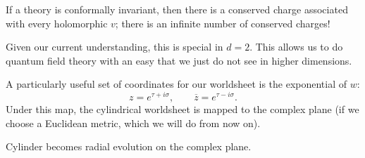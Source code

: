 If a theory is conformally invariant, then there is a conserved charge associated with every holomorphic $v$; there is an infinite number of conserved charges!
\begin{remark}
  Given our current understanding, this is special in $d = 2$.
  This allows us to do quantum field theory with an easy that we just do not see in higher dimensions.
\end{remark}

A particularly useful set of coordinates for our worldsheet is the exponential of $w$:
\begin{equation}
  \label{eq:z}
  z = e^{\tau + i \sigma}, \qquad \overline{z}{} = e^{\tau - i \sigma}.
\end{equation}
Under this map, the cylindrical worldsheet is mapped to the complex plane (if we choose a Euclidean metric, which we will do from now on).

\begin{figure}[tbhp]
  \centering
  \begin{minipage}[t]{0.5\columnwidth}
    \centering
    \def\svgwidth{0.9\columnwidth}
    
    \caption{}
    \label{fig:l10f1}
  \end{minipage}%
  \begin{minipage}[t]{0.5\columnwidth}
    \centering
    \def\svgwidth{0.6\columnwidth}
    
    \caption{}
    \label{fig:l10f2}
  \end{minipage}
\end{figure}

Cylinder becomes radial evolution on the complex plane.
